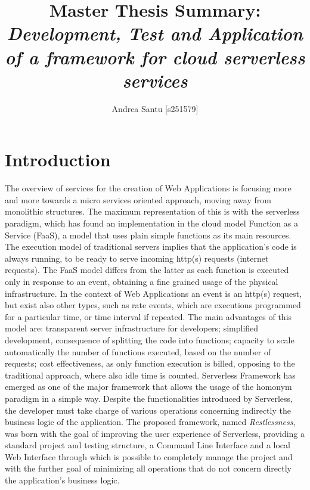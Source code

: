 \documentclass{article}
\begin{document}
\title{Master Thesis Summary: \textit{Development, Test and Application of a framework for cloud serverless services}}

\author{Andrea Santu [s251579]}

\maketitle

\section{Introduction}
The overview of services for the creation of Web Applications is focusing more
and more towards a micro services oriented approach, moving away from monolithic
structures.
The maximum representation of this is with the serverless paradigm, which has
found an implementation in the cloud model Function as a Service (FaaS), a model
that uses plain simple functions as its main resources. The execution model of
traditional servers implies that the application's code is always running, to be
ready to serve incoming http(s) requests (internet requests). The FaaS model differs
from the latter as each function is executed only in response to an event, obtaining
a fine grained usage of the physical infrastructure. In the context of Web
Applications an event is an http(s) request, but exist also other types, such as
rate events, which are executions programmed for a particular time, or time
interval if repeated.
The main advantages of this model are: transparent server infrastructure for developers;
simplified development, consequence of splitting the code into functions; capacity
to scale automatically the number of functions executed, based on the number of requests;
cost effectiveness, as only function execution is billed, opposing to the traditional
approach, where also idle time is counted.
Serverless Framework has emerged as one of the major framework that allows the
usage of the homonym paradigm in a simple way.
Despite the functionalities introduced by Serverless, the developer must take
charge of various operations concerning indirectly the business logic of the
application.
The proposed framework, named \textit{Restlessness}, was born with the goal of
improving the user experience of Serverless, providing a standard project and testing
structure, a Command Line Interface and a local Web Interface through which is
possible to completely manage the project and with the further goal of minimizing
all operations that do not concern directly the application's business logic.
\end{document}
